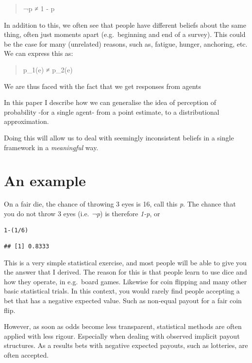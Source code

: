 \documentclass[a4paper]{book}\usepackage{graphicx, color}
\makeatletter
\newenvironment{kframe}{%
 \def\at@end@of@kframe{}%
 \ifinner\ifhmode%
  \def\at@end@of@kframe{\end{minipage}}%
  \begin{minipage}{\columnwidth}%
 \fi\fi%
 \def\FrameCommand##1{\hskip\@totalleftmargin \hskip-\fboxsep
 \colorbox{shadecolor}{##1}\hskip-\fboxsep
     \hskip-\linewidth \hskip-\@totalleftmargin \hskip\columnwidth}%
 \MakeFramed {\advance\hsize-\width
   \@totalleftmargin\z@ \linewidth\hsize
   \@setminipage}}%
 {\par\unskip\endMakeFramed%
 \at@end@of@kframe}
\newenvironment{knitrout}{}{} %
\makeatother
\begin{document}
\begin{quote}
¬p ≠ 1 - p
\end{quote}

In addition to this, we often see that people have different beliefs
about the same thing, often just moments apart (e.g.~beginning and end
of a survey). This could be the case for many (unrelated) reasons, such
as, fatigue, hunger, anchoring, etc. We can express this as:

\begin{quote}
p\_1(e) ≠ p\_2(e)
\end{quote}

We are thus faced with the fact that we get responses from agents

In this paper I describe how we can generalise the idea of perception of
probability -for a single agent- from a point estimate, to a
distributional approximation.

Doing this will allow us to deal with seemingly inconsistent beliefs in
a single framework in a \emph{meaningful} way.

\section{An example}

On a fair die, the chance of throwing 3 eyes is 16, call this \emph{p}.
The chance that you do not throw 3 eyes (i.e. \emph{¬p}) is therefore
\emph{1-p}, or

\begin{knitrout}
\color{fgcolor}\begin{kframe}
\begin{alltt}
1 - (1/6)
\end{alltt}
\begin{verbatim}
## [1] 0.8333
\end{verbatim}
\end{kframe}
\end{knitrout}


This is a very simple statistical exercise, and most people will be able
to give you the answer that I derived. The reason for this is that
people learn to use dice and how they operate, in e.g.~board games.
Likewise for coin flipping and many other basic statistical trials. In
this context, you would rarely find people accepting a bet that has a
negative expected value. Such as non-equal payout for a fair coin flip.

However, as soon as odds become less transparent, statistical methods
are often applied with less rigour. Especially when dealing with
observed implicit payout structures. As a results bets with negative
expected payouts, such as lotteries, are often accepted.
\end{document}
